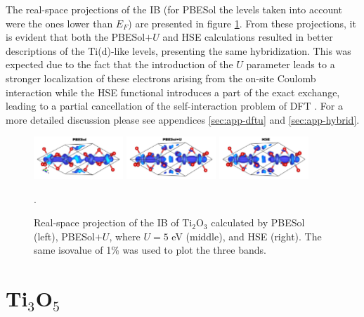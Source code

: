 The real-space projections of the IB (for PBESol the levels taken into account were the ones lower than $E_F$) are presented in figure \ref{fig:parchg-ti2o3-prb}. From these projections, it is evident that both the PBESol$+U$ and HSE calculations resulted in better descriptions of the Ti(d)-like levels, presenting the same hybridization. This was expected due to the fact that the introduction of the $U$ parameter leads to a stronger localization of these electrons arising from the on-site Coulomb interaction while the HSE functional introduces a part of the exact exchange, leading to a partial cancellation of the self-interaction problem of DFT \cite{Kim2009}. For a more detailed discussion please see appendices \ref{sec:app-dftu} and \ref{sec:app-hybrid}.
 \begin{center}
  \begin{figure}[ht!]
      \begin{center}
        \includegraphics[width=0.3\textwidth]{img/ti2o3-parchg-pbesol+u-0.jpg}
        \includegraphics[width=0.3\textwidth]{img/ti2o3-parchg-pbesol+u-5.jpg}
        \includegraphics[width=0.3\textwidth]{img/ti2o3-parchg-hse.jpg} 
      \end{center}
      \caption{Real-space projection of the IB of Ti$_2$O$_3$ calculated by PBESol (left), PBESol$+U$, where $U = 5$ eV (middle), and HSE (right). The same isovalue of 1\% was used to plot the three bands.}.
      \label{fig:parchg-ti2o3-prb} 
  \end{figure}
\end{center}

\section{Ti$_3$O$_5$}

